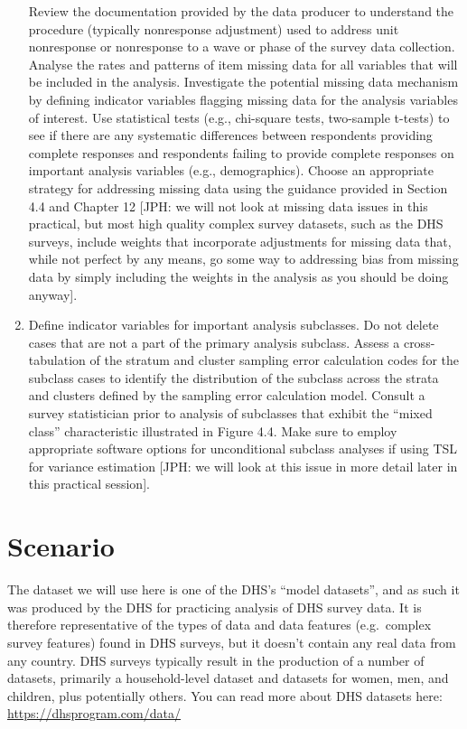 \documentclass[
]{book}
\begin{document}
\begin{enumerate}
  Review the documentation provided by the data producer to understand the procedure (typically nonresponse adjustment) used to address unit nonresponse or nonresponse to a wave or phase of the survey data collection. Analyse the rates and patterns of item missing data for all variables that will be included in the analysis. Investigate the potential missing data mechanism by defining indicator variables flagging missing data for the analysis variables of interest. Use statistical tests (e.g., chi-square tests, two-sample t-tests) to see if there are any systematic differences between respondents providing complete responses and respondents failing to provide complete responses on important analysis variables (e.g., demographics). Choose an appropriate strategy for addressing missing data using the guidance provided in Section 4.4 and Chapter 12 {[}JPH: we will not look at missing data issues in this practical, but most high quality complex survey datasets, such as the DHS surveys, include weights that incorporate adjustments for missing data that, while not perfect by any means, go some way to addressing bias from missing data by simply including the weights in the analysis as you should be doing anyway{]}.
\item
  Define indicator variables for important analysis subclasses. Do not delete cases that are not a part of the primary analysis subclass. Assess a cross-tabulation of the stratum and cluster sampling error calculation codes for the subclass cases to identify the distribution of the subclass across the strata and clusters defined by the sampling error calculation model. Consult a survey statistician prior to analysis of subclasses that exhibit the ``mixed class'' characteristic illustrated in Figure 4.4. Make sure to employ appropriate software options for unconditional subclass analyses if using TSL for variance estimation {[}JPH: we will look at this issue in more detail later in this practical session{]}.
\end{enumerate}

\hypertarget{scenario-13}{%
\section{Scenario}\label{scenario-13}}

The dataset we will use here is one of the DHS's ``model datasets'', and as such it was produced by the DHS for practicing analysis of DHS survey data. It is therefore representative of the types of data and data features (e.g.~complex survey features) found in DHS surveys, but it doesn't contain any real data from any country. DHS surveys typically result in the production of a number of datasets, primarily a household-level dataset and datasets for women, men, and children, plus potentially others. You can read more about DHS datasets here: \url{https://dhsprogram.com/data/}
\end{document}
